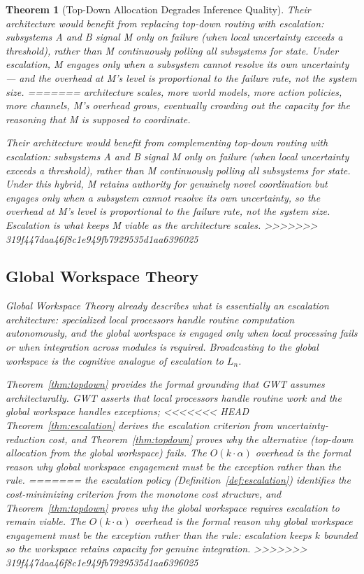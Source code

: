 \documentclass[11pt]{article}
\newtheorem{theorem}{Theorem}
\theoremstyle{definition}
\begin{document}
\begin{theorem}[Top-Down Allocation Degrades Inference Quality]
Their architecture would benefit from replacing top-down routing with
escalation: subsystems A and B signal M only on failure (when local
uncertainty exceeds a threshold), rather than M continuously polling
all subsystems for state. Under escalation, M engages only when a
subsystem cannot resolve its own uncertainty --- and the overhead at
M's level is proportional to the \emph{failure rate}, not the
\emph{system size}.
=======
architecture scales, more world models, more action policies, more
channels, M's overhead grows, eventually crowding out the capacity
for the reasoning that M is supposed to coordinate.

Their architecture would benefit from complementing top-down routing
with escalation: subsystems A and B signal M only on failure (when
local uncertainty exceeds a threshold), rather than M continuously
polling all subsystems for state. Under this hybrid, M retains
authority for genuinely novel coordination but engages only when a
subsystem cannot resolve its own uncertainty, so the overhead at
M's level is proportional to the \emph{failure rate}, not the
\emph{system size}. Escalation is what keeps M viable as the
architecture scales.
>>>>>>> 319f447daa46f8c1e949fb7929535d1aa6396025

\subsection{Global Workspace Theory}

Global Workspace Theory \cite{Baars1988,Dehaene2011} already
describes what is essentially an escalation architecture: specialized
local processors handle routine computation autonomously, and the
global workspace is engaged only when local processing fails or when
integration across modules is required. Broadcasting to the global
workspace is the cognitive analogue of escalation to $L_n$.

Theorem~\ref{thm:topdown} provides the formal grounding that GWT
assumes architecturally. GWT \emph{asserts} that local processors
handle routine work and the global workspace handles exceptions;
<<<<<<< HEAD
Theorem~\ref{thm:escalation} \emph{derives} the escalation criterion
from uncertainty-reduction cost, and Theorem~\ref{thm:topdown}
\emph{proves} why the alternative (top-down allocation from the global
workspace) fails. The $O(k \cdot \alpha)$ overhead is the formal
reason why global workspace engagement must be the exception rather
than the rule.
=======
the escalation policy (Definition~\ref{def:escalation}) identifies the
cost-minimizing criterion from the monotone cost structure, and
Theorem~\ref{thm:topdown}
\emph{proves} why the global workspace requires escalation to remain
viable. The $O(k \cdot \alpha)$ overhead is the formal
reason why global workspace engagement must be the exception rather
than the rule: escalation keeps $k$ bounded so the workspace retains
capacity for genuine integration.
>>>>>>> 319f447daa46f8c1e949fb7929535d1aa6396025


\end{theorem}
\end{document}
